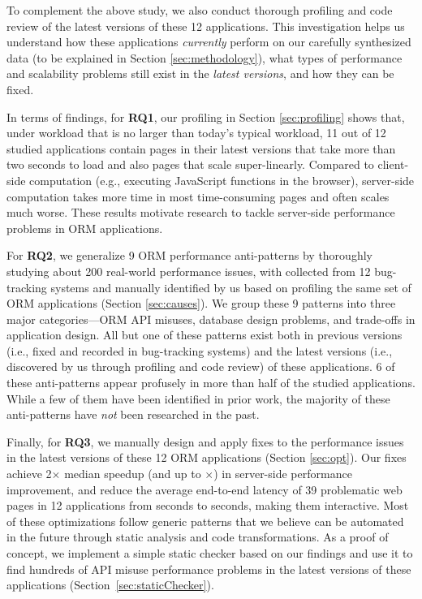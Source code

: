 To complement the above study, we also conduct thorough profiling and code review of the latest versions of these 12 applications. This investigation helps us understand how these applications \textit{currently} perform on our carefully synthesized data (to be explained in Section \ref{sec:methodology}),  what types of performance and scalability problems still exist in the \textit{latest versions}, and how they can be fixed.

In terms of findings,
for {\bf RQ1}, our profiling in Section \ref{sec:profiling} shows that, under workload that is no larger than today's typical 
workload, 11 out of 12 studied applications contain pages in their latest versions that take more than two seconds to load and also pages that scale super-linearly. Compared to client-side computation (e.g., executing JavaScript functions in the browser), server-side computation takes more time in most time-consuming pages and often scales much worse. 
These results motivate research to tackle server-side performance problems in ORM applications.

For {\bf RQ2}, we generalize 9 ORM performance anti-patterns by thoroughly studying about 200 real-world performance issues, with \numissues collected from 12 bug-tracking systems and \numacissues manually identified by us based on profiling the same set of ORM applications (Section \ref{sec:causes}).  We group these 9 patterns into three major categories---ORM API misuses, database design problems, and trade-offs in application design.
All but one of these patterns exist both in previous versions (i.e., fixed and recorded in bug-tracking systems) and the latest versions (i.e., discovered by us through profiling and code review) of these applications.
6 of these anti-patterns appear profusely in more than half of the studied applications. While a few of them have been identified in prior work, the majority of these anti-patterns have \textit{not} been researched in the past.

Finally, for {\bf RQ3}, we manually design and apply fixes to the \numacissues performance issues in the latest versions of these 12 ORM applications (Section \ref{sec:opt}). Our fixes achieve 2$\times$ median speedup (and up to \maxspeedup$\times$) in server-side performance improvement, and reduce the average end-to-end latency of 39 problematic web pages in 12 applications from \eoebefore seconds to \eoeafter seconds, making them interactive.
Most of these optimizations follow generic patterns that we believe can be automated in the future through static analysis and code transformations. As a proof of concept, we implement a simple static checker based on our findings and use it to find hundreds of API misuse performance problems in the latest versions of these applications (Section~\ref{sec:staticChecker}).